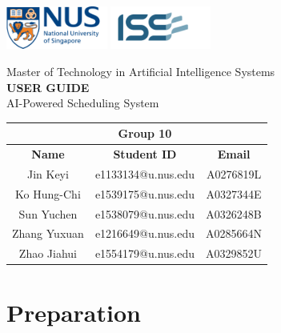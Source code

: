\documentclass[12pt, a4paper]{article}
\begin{document}
\begin{flushright}
    \includegraphics[height=40pt]{Images/Logos/nus.png} 
    \vrule
    \includegraphics[height=40pt]{Images/Logos/iss.png}
\end{flushright}

\vspace{1.0in}

\begin{center}   
    \large Master of Technology in Artificial Intelligence Systems \\
    \Huge \MakeUppercase{\textbf{User Guide}} \\
    \Large AI-Powered Scheduling System \\

    \vspace{4.0in}
    
    \normalsize
    \begin{tabular}{c c c}
        \toprule
        & \textbf{Group 10} & \\ \midrule
        \textbf{Name} & \textbf{Student ID} & \textbf{Email} \\ \midrule
        Jin Keyi & e1133134@u.nus.edu & A0276819L \\ 
        Ko Hung-Chi & e1539175@u.nus.edu & A0327344E \\ 
        Sun Yuchen & e1538079@u.nus.edu & A0326248B \\ 
        Zhang Yuxuan & e1216649@u.nus.edu & A0285664N \\
        Zhao Jiahui & e1554179@u.nus.edu & A0329852U \\ \bottomrule
    \end{tabular}
\end{center}

\newpage

\tableofcontents

\newpage

\section{Preparation} 
\end{document}
